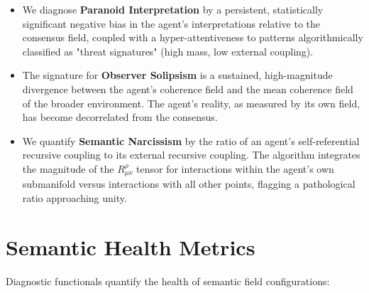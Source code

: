 \begin{itemize}

    \item We diagnose \textbf{Paranoid Interpretation} by a persistent, statistically significant negative bias in the agent's interpretations relative to the consensus field, coupled with a hyper-attentiveness to patterns algorithmically classified as "threat signatures" (high mass, low external coupling).

    \item The signature for \textbf{Observer Solipsism} is a sustained, high-magnitude divergence between the agent's coherence field and the mean coherence field of the broader environment. The agent's reality, as measured by its own field, has become decorrelated from the consensus.

    \item We quantify \textbf{Semantic Narcissism} by the ratio of an agent's self-referential recursive coupling to its external recursive coupling. The algorithm integrates the magnitude of the \(R^\rho_{\mu\nu}\) tensor for interactions within the agent's own submanifold versus interactions with all other points, flagging a pathological ratio approaching unity.

\end{itemize}


\section{Semantic Health Metrics}
\label{16.4:semantic_health_metrics}

Diagnostic functionals quantify the health of semantic field configurations:

